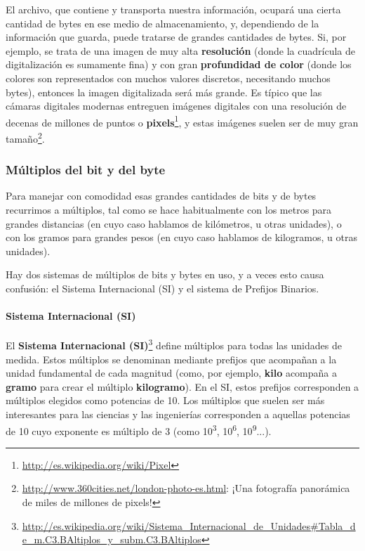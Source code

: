 \documentclass[a4paper]{article}
\begin{document}
El archivo, que contiene y transporta nuestra información, ocupará
una cierta cantidad de bytes en ese medio de almacenamiento, y,
dependiendo de la información que guarda, puede tratarse de grandes
cantidades de bytes. Si, por ejemplo, se trata de una imagen de muy
alta \textbf{resolución} (donde la cuadrícula de digitalización
es sumamente fina) y con gran \textbf{profundidad de color} (donde los
colores son representados con muchos valores discretos, necesitando
muchos bytes), entonces la imagen digitalizada será más grande. Es
típico que las cámaras digitales modernas entreguen imágenes
digitales con una resolución de decenas de millones de puntos o
\textbf{pixels}\footnote{\url{http://es.wikipedia.org/wiki/Pixel}},
y estas imágenes suelen ser de muy gran
tamaño\footnote{\url{http://www.360cities.net/london-photo-es.html}:
¡Una fotografía panorámica de miles de millones de pixels! }.

\subsubsection[Múltiplos del bit y del byte]{Múltiplos del bit y del
byte}
Para manejar con comodidad esas grandes cantidades de bits y de bytes
recurrimos a múltiplos, tal como se hace habitualmente con los metros
para grandes distancias (en cuyo caso hablamos de kilómetros, u otras
unidades), o con los gramos para grandes pesos (en cuyo caso hablamos
de kilogramos, u otras unidades). 

Hay dos sistemas de múltiplos de bits y bytes en uso, y a veces esto
causa confusión: el Sistema Internacional (SI) y el sistema de
Prefijos Binarios.

\paragraph{Sistema Internacional (SI)}
El \textbf{Sistema Internacional (SI)}\footnote{\url{http://es.wikipedia.org/wiki/Sistema_Internacional_de_Unidades\#Tabla_de_m.C3.BAltiplos_y_subm.C3.BAltiplos}} 
define múltiplos para todas las unidades de medida. Estos múltiplos
se denominan mediante prefijos que acompañan a la unidad fundamental
de cada magnitud (como, por ejemplo, \textbf{kilo} acompaña a
\textbf{gramo} para crear el múltiplo \textbf{kilogramo}). En el SI,
estos prefijos corresponden a múltiplos elegidos como potencias de
10. Los múltiplos que suelen ser más interesantes para las ciencias
y las ingenierías corresponden a aquellas potencias de 10 cuyo
exponente es múltiplo de 3 (como 10\textsuperscript{3}, 10\textsuperscript{6},
10\textsuperscript{9}...).
\end{document}

